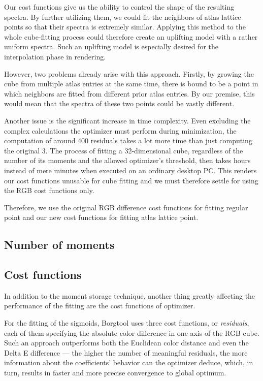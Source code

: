 Our cost functions give us the ability to control the shape of the resulting spectra. By further utilizing them, we could fit the neighbors of atlas lattice points so that their spectra is extremely similar. Applying this method to the whole cube-fitting process could therefore create an uplifting model with a rather uniform spectra. Such an uplifting model is especially desired for the interpolation phase in rendering.

However, two problems already arise with this approach. Firstly, by growing the cube from multiple atlas entries at the same time, there is bound to be a point in which neighbors are fitted from different prior atlas entries. By our premise, this would mean that the spectra of these two points could be vastly different.

Another issue is the significant increase in time complexity. Even excluding the complex calculations the optimizer must perform during minimization, the computation of around 400 residuals takes a lot more time than just computing the original 3. The process of fitting a 32-dimensional cube, regardless of the number of its moments and the allowed optimizer's threshold, then takes hours instead of mere minutes when executed on an ordinary desktop PC. This renders our cost functions unusable for cube fitting and we must therefore settle for using the RGB cost functions only.

Therefore, we use the original RGB difference cost functions for fitting regular point and our new cost functions for fitting atlas lattice point.

\subsection{Number of moments} \label{ssec:noOfMoments}

\subsection{Cost functions} \label{ssec:costFunctions}

In addition to the moment storage technique, another thing greatly affecting the performance of the fitting are the cost functions of optimizer.

For the fitting of the sigmoids, Borgtool uses three cost functions, or \emph{residuals}, each of them specifying the absolute color difference in one axis of the RGB cube. Such an approach outperforms both the Euclidean color distance and even the Delta E difference --- the higher the number of meaningful residuals, the more information about the coefficients' behavior can the optimizer deduce, which, in turn, results in faster and more precise convergence to global optimum.

